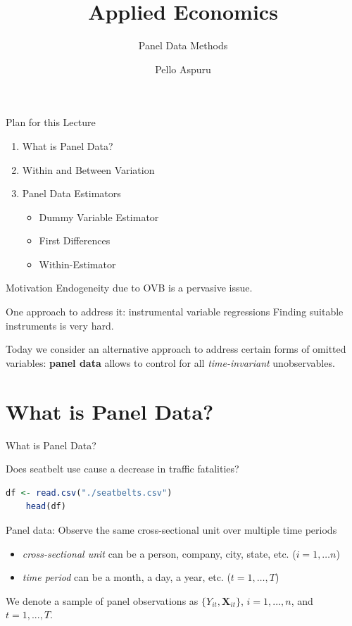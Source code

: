 \documentclass[11pt, aspectratio = 169]{beamer}
\title{Applied Economics}
\subtitle{Panel Data Methods}
\author{Pello Aspuru}
\date{}
\institute{Winter 2025/26}
\begin{document}
%
\maketitle

\begin{frame}{Plan for this Lecture}
\begin{enumerate}

\item What is Panel Data?

\item  Within and Between Variation

\item Panel Data Estimators
\begin{itemize}
\item Dummy Variable Estimator
\item First Differences
\item Within-Estimator 
\end{itemize}
\end{enumerate}
\end{frame}

\begin{frame}{Motivation}
Endogeneity due to OVB is a pervasive issue.

One approach to address it: instrumental variable regressions
\pause
Finding suitable instruments is very hard.

Today we consider an alternative approach to address certain forms of omitted variables: 
\textbf{panel data} allows to control for all \textit{time-invariant} unobservables.

\end{frame}

\section{What is Panel Data?}

\begin{frame}[fragile]{What is Panel Data?}

\begin{center}
    Does seatbelt use \alert{cause} a decrease in traffic fatalities?
\end{center}   
\begin{lstlisting}[language=R]
    df <- read.csv("./seatbelts.csv")
    head(df)
\end{lstlisting}
\pause
Panel data: Observe the same cross-sectional unit over multiple time periods 
\begin{itemize}
    \item \textit{cross-sectional unit} can be a person, company, city, \alert{state}, etc. ($i = 1,…n$) 
    \item \textit{time period} can be a month, a day, \alert{a year}, etc. ($t = 1,…,T$)
\end{itemize}

We denote a sample of panel observations as  $\{Y_{it}, \boldsymbol{X}_{it}\}$,  $i = 1, ... , n$, and $t = 1, ..., T$.
\end{frame}
\end{document}
